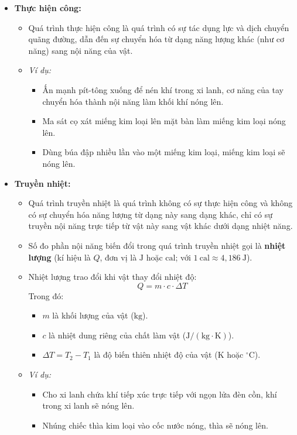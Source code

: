 \begin{itemize}
    \item \textbf{Thực hiện công:}
    \begin{itemize}
        \item Quá trình thực hiện công là quá trình có sự tác dụng lực và dịch chuyển quãng đường, dẫn đến sự chuyển hóa từ dạng năng lượng khác (như cơ năng) sang nội năng của vật.
        \item \textit{Ví dụ:}
        \begin{itemize}
            \item Ấn mạnh pít-tông xuống để nén khí trong xi lanh, cơ năng của tay chuyển hóa thành nội năng làm khối khí nóng lên.
            \item Ma sát cọ xát miếng kim loại lên mặt bàn làm miếng kim loại nóng lên.
            \item Dùng búa đập nhiều lần vào một miếng kim loại, miếng kim loại sẽ nóng lên.
        \end{itemize}
    \end{itemize}
    \item \textbf{Truyền nhiệt:}
    \begin{itemize}
        \item Quá trình truyền nhiệt là quá trình không có sự thực hiện công và không có sự chuyển hóa năng lượng từ dạng này sang dạng khác, chỉ có sự truyền nội năng trực tiếp từ vật này sang vật khác dưới dạng nhiệt năng.
        \item Số đo phần nội năng biến đổi trong quá trình truyền nhiệt gọi là \textbf{nhiệt lượng} (kí hiệu là $Q$, đơn vị là $\mathrm{J}$ hoặc $\mathrm{cal}$; với $1\ \mathrm{cal} \approx 4{,}186\ \mathrm{J}$).
        \item Nhiệt lượng trao đổi khi vật thay đổi nhiệt độ:
        \[
        Q = m \cdot c \cdot \Delta T
        \]
        Trong đó:
        \begin{itemize}
            \item $m$ là khối lượng của vật ($\mathrm{kg}$).
            \item $c$ là nhiệt dung riêng của chất làm vật ($\mathrm{J/(kg \cdot K)}$).
            \item $\Delta T = T_2 - T_1$ là độ biến thiên nhiệt độ của vật ($\mathrm{K}$ hoặc $\mathrm{^\circ C}$).
        \end{itemize}
        \item \textit{Ví dụ:}
        \begin{itemize}
            \item Cho xi lanh chứa khí tiếp xúc trực tiếp với ngọn lửa đèn cồn, khí trong xi lanh sẽ nóng lên.
            \item Nhúng chiếc thìa kim loại vào cốc nước nóng, thìa sẽ nóng lên.
        \end{itemize}
    \end{itemize}
\end{itemize}

